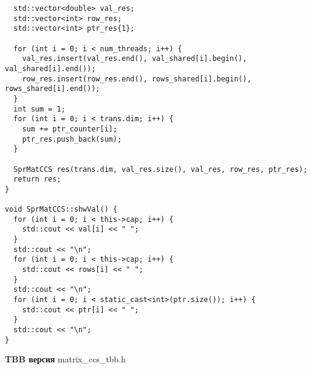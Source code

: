 \documentclass{report}
\begin{document}
\begin{lstlisting}
  std::vector<double> val_res;
  std::vector<int> row_res;
  std::vector<int> ptr_res{1};

  for (int i = 0; i < num_threads; i++) {
    val_res.insert(val_res.end(), val_shared[i].begin(), val_shared[i].end());
    row_res.insert(row_res.end(), rows_shared[i].begin(), rows_shared[i].end());
  }
  int sum = 1;
  for (int i = 0; i < trans.dim; i++) {
    sum += ptr_counter[i];
    ptr_res.push_back(sum);
  }

  SprMatCCS res(trans.dim, val_res.size(), val_res, row_res, ptr_res);
  return res;
}

void SprMatCCS::shwVal() {
  for (int i = 0; i < this->cap; i++) {
    std::cout << val[i] << " ";
  }
  std::cout << "\n";
  for (int i = 0; i < this->cap; i++) {
    std::cout << rows[i] << " ";
  }
  std::cout << "\n";
  for (int i = 0; i < static_cast<int>(ptr.size()); i++) {
    std::cout << ptr[i] << " ";
  }
  std::cout << "\n";
}
\end{lstlisting}

\newpage
\textbf{TBB версия}
\newline
\newline matrix\_ccs\_tbb.h
\end{document}
